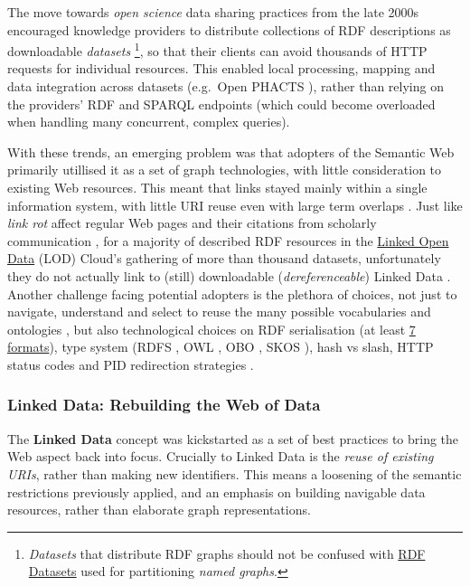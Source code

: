 The move towards \emph{open science} data sharing practices from the late 2000s encouraged knowledge providers to distribute collections of RDF descriptions as downloadable \emph{datasets} \footnote{\emph{Datasets} that distribute RDF graphs should not be confused with \href{https://www.w3.org/TR/rdf11-concepts/\#section-dataset}{RDF Datasets} used for partitioning \emph{named graphs}.}, so that their clients can avoid thousands of HTTP requests for individual resources. This enabled local processing, mapping and data integration across datasets (e.g.~Open PHACTS \cite{grothAPIcentricLinkedData2014b}), rather than relying on the providers' RDF and SPARQL endpoints (which could become overloaded when handling many concurrent, complex queries).

With these trends, an emerging problem was that adopters of the Semantic Web primarily utillised it as a set of graph technologies, with little consideration to existing Web resources. This meant that links stayed mainly within a single information system, with little URI reuse even with large term overlaps \cite{kamdarSystematicAnalysisTerm2017a}. Just like \emph{link rot} affect regular Web pages and their citations from scholarly communication \cite{kleinScholarlyContextNot2014a}, for a majority of described RDF resources in the \href{https://lod-cloud.net/}{Linked Open Data} (LOD) Cloud's gathering of more than thousand datasets, unfortunately they do not actually link to (still) downloadable (\emph{dereferenceable}) Linked Data \cite{polleresMoreDecentralizedVision2020a}. Another challenge facing potential adopters is the plethora of choices, not just to navigate, understand and select to reuse the many possible vocabularies and ontologies \cite{carrieroLandscapeOntologyReuse2020a}, but also technological choices on RDF serialisation (at least \href{https://www.w3.org/TR/rdf11-primer/\#section-graph-syntax}{7 formats}), type system (RDFS \cite{w3-rdf-schema}, OWL \cite{w3-owl2-overview}, OBO \cite{tirmiziMappingOBOOWL2011a}, SKOS \cite{w3-skos-primer}), hash vs slash, HTTP status codes and PID redirection strategies \cite{sauermannCoolURIsSemantic2011}.

\hypertarget{ch3:ld-web}{%
\subsubsection{Linked Data: Rebuilding the Web of Data}\label{ch3:ld-web}}

The \textbf{Linked Data} concept \cite{bizerLinkedDataStory2009a} was kickstarted as a set of best practices \cite{LinkedDataDesign} to bring the Web aspect back into focus. Crucially to Linked Data is the \emph{reuse of existing URIs}, rather than making new identifiers. This means a loosening of the semantic restrictions previously applied, and an emphasis on building navigable data resources, rather than elaborate graph representations.

